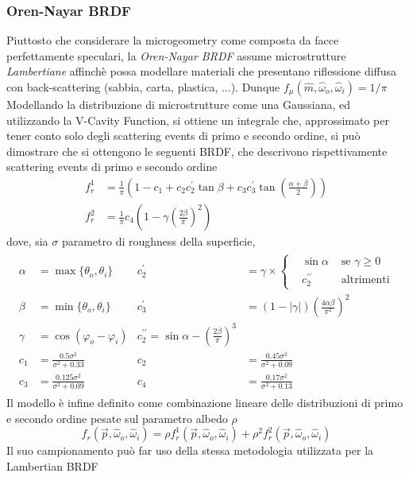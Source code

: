 \subsubsection{Oren-Nayar BRDF}
Piuttosto che considerare la microgeometry come composta da facce perfettamente speculari, la \textit{Oren-Nayar BRDF} assume microstrutture 
\textit{Lambertiane} affinch\`e possa modellare materiali che presentano riflessione diffusa con back-scattering (sabbia, carta, plastica, ...).
Dunque \mbox{$f_\mu(\hat{m},\hat{\omega}_o,\hat{\omega}_i)=1/\pi$}
Modellando la distribuzione di microstrutture come una Gaussiana, ed utilizzando la V-Cavity Function, si ottiene un integrale che, approssimato
per tener conto solo degli scattering events di primo e secondo ordine, si pu\`o dimostrare che si ottengono le seguenti BRDF, che descrivono 
rispettivamente scattering events di primo e secondo ordine
\begin{align}
	f_r^1&=\frac{1}{\pi}\left(1-c_1+c_2c_2^\prime\tan\beta+c_3c_3^\prime\tan\left(\frac{\alpha+\beta}{2}\right)\right) \\
	f_r^2&=\frac{1}{\pi}c_4\left(1-\gamma\left(\frac{2\beta}{\pi}\right)^2\right)
\end{align}
dove, sia $\sigma$ parametro di roughness della superficie, \cite{pegoraro}
\begin{align}
	\begin{array}{rlrl}
		\alpha&=\max\{\theta_o,\theta_i\} & c_2^\prime&=\gamma\times\left\{\begin{aligned}
			&\sin\alpha	&\text{ se }\gamma\geq0 \\
			&c_2^{\prime\prime}&\text{ altrimenti}
		\end{aligned}\right. \\
		\beta&=\min\{\theta_o,\theta_i\} & c_3^\prime&=(1-|\gamma|)\left(\frac{4\alpha\beta}{\pi^2}\right)^2 \\
		\gamma&=\cos(\varphi_o-\varphi_i) & c_2^{\prime\prime}=\sin\alpha-\left(\frac{2\beta}{\pi}\right)^3 \\
		c_1&=\frac{0.5\sigma^2}{\sigma^2+0.33} & c_2&=\frac{0.45\sigma^2}{\sigma^2+0.09} \\
		c_3&=\frac{0.125\sigma^2}{\sigma^2+0.09} & c_4&=\frac{0.17\sigma^2}{\sigma^2+0.13}
	\end{array}
\end{align}
Il modello \`e infine definito come combinazione lineare delle distribuzioni di primo e secondo ordine pesate sul parametro albedo $\rho$
\begin{equation}
	f_r(\vec{p},\hat{\omega}_o,\hat{\omega}_i)=\rho f_r^1(\vec{p},\hat{\omega}_o,\hat{\omega}_i)+\rho^2f_r^2(\vec{p},\hat{\omega}_o,\hat{\omega}_i)
\end{equation}
Il suo campionamento pu\`o far uso della stessa metodologia utilizzata per la Lambertian BRDF

